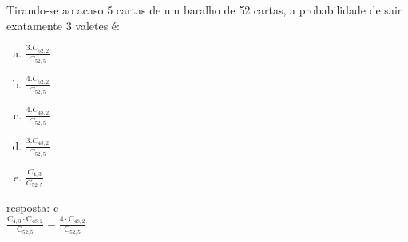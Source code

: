 \begin{ex}
 Tirando-se ao acaso 5 cartas de um baralho de 52 cartas, a probabilidade de sair exatamente 3 valetes é:
    \begin{enumerate}[(a)]
    \item $\frac{3.C_{{52},2}}{C_{{52},5}}$
    \item $\frac{4.C_{{52},2}}{C_{{52},5}}$
    \item $\frac{4.C_{{48},2}}{C_{{52},5}}$
    \item $\frac{3.C_{{48},2}}{C_{{52},5}}$
    \item $\frac{C_{4,3}}{C_{{52},5}}$
    \end{enumerate}
      \begin{sol}
      resposta: c \\
      $\frac{\mathrm{C}_{4,3}\cdot\mathrm{C}_{{48},2}}{\mathrm{C}_{{52},5}}=\frac{4\cdot\mathrm{C}_{{48},2}}{\mathrm{C}_{{52},5}}$
      \end{sol}
\end{ex}